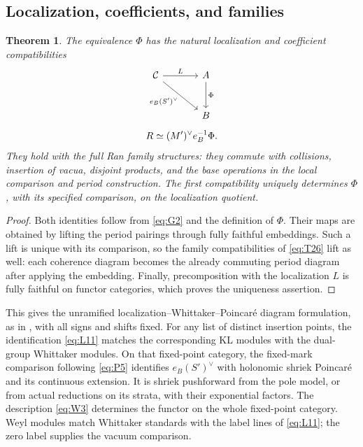 \documentclass[11pt]{article}
\numberwithin{equation}{section}
\newtheorem{theorem}{Theorem}[section]
\theoremstyle{definition}
\theoremstyle{remark}
\begin{document}
\subsection{Localization, coefficients, and families}

\begin{theorem}\label{equivalence:compatibility}
The equivalence \(\Phi\) has the natural localization and coefficient
compatibilities
\begin{equation}\label{eq:G5}
 \begin{gathered}
 \begin{tikzcd}[ampersand replacement=\&,column sep=large,row sep=large]
 \mathcal C \arrow[r,"L"] \arrow[dr,"e_B(S')^\vee"']
   \& A \arrow[d,"\Phi"] \\
   \& B
 \end{tikzcd}
 \\[1ex]
 R\simeq(M')^\vee e_B^{-1}\Phi.
 \end{gathered}
\end{equation}
They hold with the full Ran family structures: they commute with
collisions, insertion of vacua, disjoint products, and the base operations
in the local comparison and period construction.  The first
compatibility uniquely determines \(\Phi\), with its specified
comparison, on the localization quotient.
\end{theorem}

\begin{proof}
Both identities follow from \eqref{eq:G2} and the definition of
\(\Phi\).  Their maps are obtained by lifting the period pairings
through fully faithful embeddings.  Such a lift is unique with its
comparison, so the family compatibilities of \eqref{eq:T26} lift as
well: each coherence diagram becomes the already commuting period
diagram after applying the embedding.  Finally, precomposition with
the localization \(L\) is fully faithful on functor categories, which
proves the uniqueness assertion.
\end{proof}

This gives the unramified localization--Whittaker--Poincar\'e diagram
formulation, as in \cite[Section~4]{GaitsgoryQGL}, with all signs and
shifts fixed.  For any list of distinct insertion points, the
identification \eqref{eq:L11} matches the corresponding KL modules
with the dual-group Whittaker modules.  On that fixed-point category,
the fixed-mark comparison following \eqref{eq:P5} identifies
\(e_B(S')^\vee\) with holonomic shriek Poincar\'e and its continuous
extension.  It is shriek pushforward from the pole model, or from
actual reductions on its strata, with their exponential factors.
The description \eqref{eq:W3} determines the functor on the whole
fixed-point category.  Weyl modules match Whittaker standards with the
label lines of \eqref{eq:L11}; the zero label supplies the vacuum
comparison.
\end{document}

